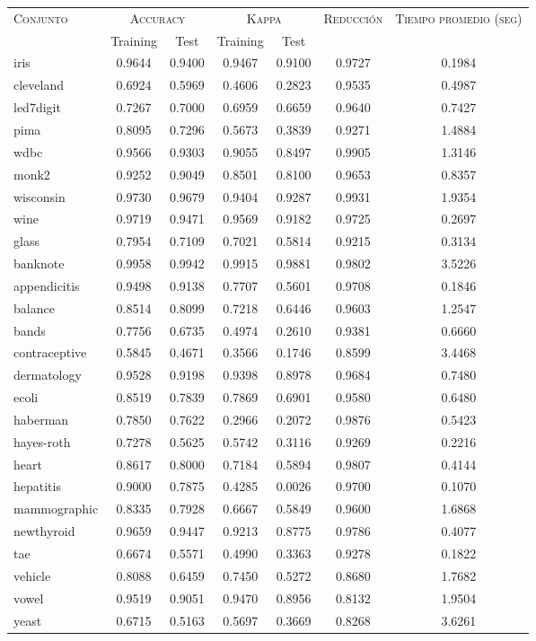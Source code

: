\begin{table}[]
\centering
\begin{tabular}{l c c c c c c}
\hline
\multirow{2}{*}{\textsc{Conjunto}}
	& \multicolumn{2}{c}{\textsc{Accuracy}}
	& \multicolumn{2}{c}{\textsc{Kappa}}
	& \textsc{Reducción}
	& \textsc{Tiempo promedio (seg)} \\
	& Training & Test
	& Training & Test \\ 
\hline
\hline

iris & 0.9644 & 0.9400 & 0.9467 & 0.9100 & 0.9727 & 0.1984 \\
cleveland & 0.6924 & 0.5969 & 0.4606 & 0.2823 & 0.9535 & 0.4987 \\
led7digit & 0.7267 & 0.7000 & 0.6959 & 0.6659 & 0.9640 & 0.7427 \\
pima & 0.8095 & 0.7296 & 0.5673 & 0.3839 & 0.9271 & 1.4884 \\
wdbc & 0.9566 & 0.9303 & 0.9055 & 0.8497 & 0.9905 & 1.3146 \\
monk2 & 0.9252 & 0.9049 & 0.8501 & 0.8100 & 0.9653 & 0.8357 \\
wisconsin & 0.9730 & 0.9679 & 0.9404 & 0.9287 & 0.9931 & 1.9354 \\
wine & 0.9719 & 0.9471 & 0.9569 & 0.9182 & 0.9725 & 0.2697 \\
glass & 0.7954 & 0.7109 & 0.7021 & 0.5814 & 0.9215 & 0.3134 \\
banknote & 0.9958 & 0.9942 & 0.9915 & 0.9881 & 0.9802 & 3.5226 \\
appendicitis & 0.9498 & 0.9138 & 0.7707 & 0.5601 & 0.9708 & 0.1846 \\
balance & 0.8514 & 0.8099 & 0.7218 & 0.6446 & 0.9603 & 1.2547 \\
bands & 0.7756 & 0.6735 & 0.4974 & 0.2610 & 0.9381 & 0.6660 \\
contraceptive & 0.5845 & 0.4671 & 0.3566 & 0.1746 & 0.8599 & 3.4468 \\
dermatology & 0.9528 & 0.9198 & 0.9398 & 0.8978 & 0.9684 & 0.7480 \\
ecoli & 0.8519 & 0.7839 & 0.7869 & 0.6901 & 0.9580 & 0.6480 \\
haberman & 0.7850 & 0.7622 & 0.2966 & 0.2072 & 0.9876 & 0.5423 \\
hayes-roth & 0.7278 & 0.5625 & 0.5742 & 0.3116 & 0.9269 & 0.2216 \\
heart & 0.8617 & 0.8000 & 0.7184 & 0.5894 & 0.9807 & 0.4144 \\
hepatitis & 0.9000 & 0.7875 & 0.4285 & 0.0026 & 0.9700 & 0.1070 \\
mammographic & 0.8335 & 0.7928 & 0.6667 & 0.5849 & 0.9600 & 1.6868 \\
newthyroid & 0.9659 & 0.9447 & 0.9213 & 0.8775 & 0.9786 & 0.4077 \\
tae & 0.6674 & 0.5571 & 0.4990 & 0.3363 & 0.9278 & 0.1822 \\
vehicle & 0.8088 & 0.6459 & 0.7450 & 0.5272 & 0.8680 & 1.7682 \\
vowel & 0.9519 & 0.9051 & 0.9470 & 0.8956 & 0.8132 & 1.9504 \\
yeast & 0.6715 & 0.5163 & 0.5697 & 0.3669 & 0.8268 & 3.6261 \\


\end{tabular}
\end{table}
